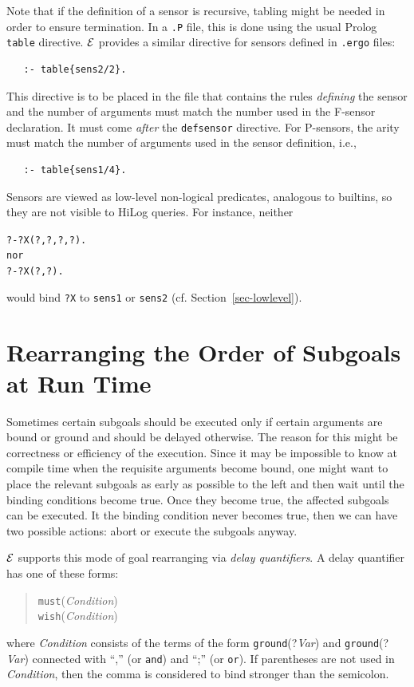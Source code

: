 \documentclass[11pt]{article}
\newcommand{\ERGO}{\mbox{\ensuremath{\cal{E}}\smaller{{\sc{RGO}}}}\xspace}
\newcommand{\FLSYSTEM}{\ERGO}
\newcommand{\ergoext}{ergo\xspace}
\newcommand{\bs}{\textbackslash}
\begin{document}
Note that if the definition of a sensor is recursive, tabling might be
needed in order to ensure termination. In a \texttt{.P} file, this is done
using the usual Prolog \texttt{table} directive. \FLSYSTEM provides a similar
directive for sensors defined in \texttt{.\ergoext} files:
\index{\bs{}table directive}
\begin{verbatim}
   :- table{sens2/2}.
\end{verbatim}
This directive is to be placed in the file that contains the rules \emph{defining}
the sensor and the number of arguments must match the number used in the
F-sensor declaration.
It must come \emph{after} the \texttt{defsensor} directive.  
For P-sensors, the arity must match the number of arguments used in the
sensor definition, i.e.,
\begin{verbatim}
   :- table{sens1/4}.
\end{verbatim}


Sensors are viewed as low-level non-logical predicates, analogous to
builtins, so
they are not visible to HiLog queries. For instance, neither
\begin{alltt}
   ?- ?X(?,?,?,?).
\textnormal{nor}
   ?- ?X(?,?).
\end{alltt}
would bind \texttt{?X}  to \texttt{sens1} or \texttt{sens2}
(cf. Section~\ref{sec-lowlevel}).

  
\section{Rearranging the Order of Subgoals at Run Time}
\label{sec-rearanging}

Sometimes certain subgoals should be executed only if certain arguments are
bound or ground and should be delayed otherwise.
The reason for this might be correctness or efficiency of the execution.
Since it may be impossible to know at compile time when the requisite
arguments become bound, one might want to place the relevant subgoals as
early as possible to the left and then wait until the binding conditions
become true. Once they become true, the affected subgoals can be
executed. It the binding condition never becomes true, then we can have two
possible actions: abort or execute the subgoals anyway.

\FLSYSTEM supports this mode of goal rearranging via \emph{delay quantifiers}.  
A delay quantifier has one of these forms:
\begin{quote}
  \texttt{must}(\emph{Condition})\\
  \texttt{wish}(\emph{Condition})  
\end{quote}
where \emph{Condition} consists of the terms of the form
\texttt{ground}(?\emph{Var}) and \texttt{ground}(?\emph{Var})
connected with ``,'' (or \texttt{and}) and ``;'' (or \texttt{or}).  
If parentheses are not used in \emph{Condition}, then the comma is
considered to bind stronger than the semicolon. 
\end{document}
